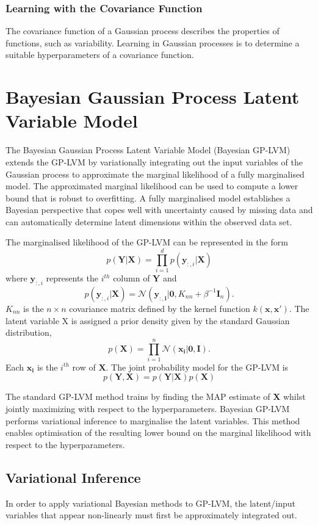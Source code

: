 \documentclass[ %
author={Dillon Keith Diep},
supervisor={Dr. Carl Henrik Ek},
degree={MEng},
title={ART-CG:},
subtitle={Assisted Real-time Content Generation of 3D Hair by Learning Manifolds},
type={Research},
year={2017} ]{dissertation}
\begin{document}
\subsubsection{Learning with the Covariance Function}
The covariance function of a Gaussian process describes the properties of functions, such as variability. Learning in Gaussian processes is to determine a suitable hyperparameters of a covariance function.

\section{Bayesian Gaussian Process Latent Variable Model}
The Bayesian Gaussian Process Latent Variable Model (Bayesian GP-LVM) \cite{bgplvm} extends the GP-LVM by variationally integrating out the input variables of the Gaussian process to approximate the marginal likelihood of a fully marginalised model. The approximated marginal likelihood can be used to compute a lower bound that is robust to overfitting. A fully marginalised model establishes a Bayesian perspective that copes well with uncertainty caused by missing data and can automatically determine latent dimensions within the observed data set.

The marginalised likelihood of the GP-LVM can be represented in the form
$$p(\bm{Y|X})=\prod^d_{i=1}p(\bm{y}_{:,i}|\bm{X})$$
where $\bm{y}_{:,i}$ represents the $i^{th}$ column of $\bm{Y}$ and
$$p(\bm{y}_{:,i}|\bm{X})=\mathcal{N}(\bm{y_{:,i}|0},K_{nn}+\beta^{-1}\bm{I}_n).$$
$K_{nn}$ is the $n \times n$ covariance matrix defined by the kernel function $k(\bm{x,x'})$.
The latent variable X is assigned a prior density given by the standard Gaussian distribution, 
$$p(\bm{X})=\prod^n_{i=1}\mathcal{N}(\bm{x_i|0, I}).$$
Each $\bm{x_i}$ is the $i^{th}$ row of $\bm{X}$. The joint probability model for the GP-LVM is
$$p(\bm{Y,X})=p(\bm{Y|X})p(\bm{X})$$

The standard GP-LVM method trains by finding the MAP estimate of $\bm{X}$ whilst jointly maximizing with respect to the hyperparameters. Bayesian GP-LVM performs variational inference to marginalise the latent variables. This method enables optimisation of the resulting lower bound on the marginal likelihood with respect to the hyperparameters. 

\subsection{Variational Inference}
{ \color{red}In order to apply variational Bayesian methods to GP-LVM, the latent/input variables that appear non-linearly must first be approximately integrated out.}
\end{document}
